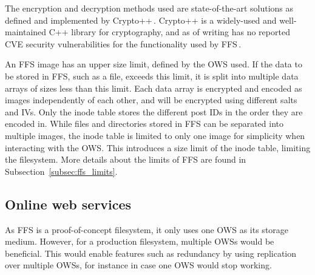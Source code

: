 The encryption and decryption methods used are \mbox{state-of-the-art} solutions as defined and implemented by Crypto++\,\cite{CryptoLibraryFree}. Crypto++ is a \mbox{widely-used} and \mbox{well-maintained} C++ library for cryptography, and as of writing has no reported CVE security vulnerabilities for the functionality used by \gls{FFS}\,\cite{CryptoppSecurityVulnerabilities}.

An \gls{FFS} image has an upper size limit, defined by the \gls{OWS} used. If the data to be stored in \gls{FFS}, such as a file, exceeds this limit, it is split into multiple data arrays of sizes less than this limit. Each data array is encrypted and encoded as images independently of each other, and will be encrypted using different salts and \gls{IV}s. Only the inode table stores the different post IDs in the order they are encoded in. While files and directories stored in \gls{FFS} can be separated into multiple images, the inode table is limited to only one image for simplicity when interacting with the \gls{OWS}. This introduces a size limit of the inode table, limiting the filesystem. More details about the limits of \gls{FFS} are found in Subsection~\ref{subsec:ffs_limits}.

\subsection{Online web services}
As \gls{FFS} is a \mbox{proof-of-concept} filesystem, it only uses one \gls{OWS} as its storage medium. However, for a production filesystem, multiple \gls{OWS}s would be beneficial. This would enable features such as redundancy by using replication over multiple \gls{OWS}s, for instance in case one \gls{OWS} would stop working.

